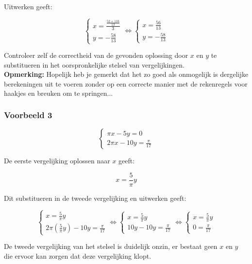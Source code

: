 Uitwerken geeft:

\[\left\{ \begin{array}{l}
x = \frac{\frac{52+116}{13}}{3} \\
y=-\frac{58}{13}
\end{array} \right. \Leftrightarrow \left\{ \begin{array}{l}
x = \frac{56}{13}\\
y=-\frac{58}{13}
\end{array} \right.\]

Controleer zelf de correctheid van de gevonden oplossing door $x$ en $y$ te substitueren in het oorspronkelijke stelsel van vergelijkingen.\\

{\bf Opmerking:} Hopelijk heb je gemerkt dat het zo goed als onmogelijk is dergelijke berekeningen uit te voeren zonder op een correcte manier met de rekenregels voor haakjes en breuken om te springen...\\

\subsubsection{Voorbeeld 3}

\[\left\{ \begin{array}{l}
\pi x - 5y = 0\\
2 \pi x - 10y = \frac{\pi}{17}
\end{array} \right.\]

De eerste vergelijking oplossen naar $x$ geeft:

\[ x=\frac{5}{\pi}y \]

Dit substitueren in de tweede vergelijking en uitwerken geeft:

\[\left\{ \begin{array}{l}
x=\frac{5}{\pi}y \\
2 \pi (\frac{5}{\pi}y) - 10y = \frac{\pi}{17}
\end{array} \right. \Leftrightarrow \left\{ \begin{array}{l}
x=\frac{5}{\pi}y \\
10y -10y = \frac{\pi}{17}
\end{array} \right. \Leftrightarrow \left\{ \begin{array}{l}
x=\frac{5}{\pi}y \\
0=\frac{\pi}{17}
\end{array} \right.\]

De tweede vergelijking van het stelsel is duidelijk onzin, er bestaat geen $x$ en $y$ die ervoor kan zorgen dat deze vergelijking klopt.\\

